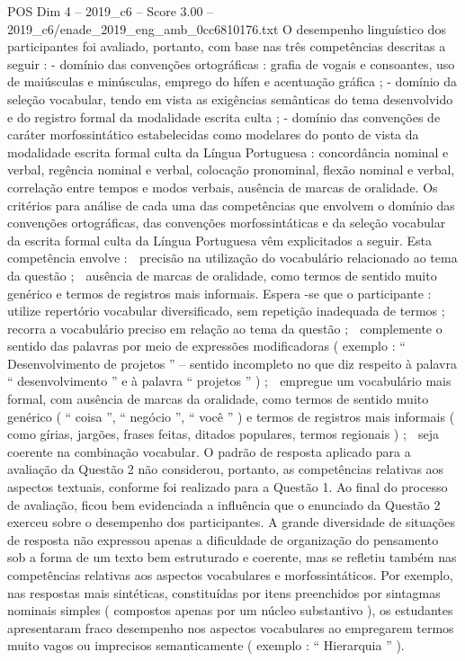 \begin{textsample}{POS Dim 4 – 2019\_c6 – Score 3.00 – 2019\_c6/enade\_2019\_eng\_amb\_0cc6810176.txt}
O desempenho linguístico dos participantes foi avaliado, portanto, com base nas três competências descritas a seguir : - domínio das convenções ortográficas : grafia de vogais e consoantes, uso de maiúsculas e minúsculas, emprego do hífen e acentuação gráfica ; - domínio da seleção vocabular, tendo em vista as exigências semânticas do tema desenvolvido e do registro formal da modalidade escrita culta ; - domínio das convenções de caráter morfossintático estabelecidas como modelares do ponto de vista da modalidade escrita formal culta da Língua Portuguesa : concordância nominal e verbal, regência nominal e verbal, colocação pronominal, flexão nominal e verbal, correlação entre tempos e modos verbais, ausência de marcas de oralidade.
Os critérios para análise de cada uma das competências que envolvem o domínio das convenções ortográficas, das convenções morfossintáticas e da seleção vocabular da escrita formal culta da Língua Portuguesa vêm explicitados a seguir.
Esta competência envolve :  precisão na utilização do vocabulário relacionado ao tema da questão ;  ausência de marcas de oralidade, como termos de sentido muito genérico e termos de registros mais informais.
Espera -se que o participante :  utilize repertório vocabular diversificado, sem repetição inadequada de termos ;  recorra a vocabulário preciso em relação ao tema da questão ;  complemente o sentido das palavras por meio de expressões modificadoras ( exemplo : “ Desenvolvimento de projetos ” – sentido incompleto no que diz respeito à palavra “ desenvolvimento ” e à palavra “ projetos ” ) ;  empregue um vocabulário mais formal, com ausência de marcas da oralidade, como termos de sentido muito genérico ( “ coisa ”, “ negócio ”, “ você ” ) e termos de registros mais informais ( como gírias, jargões, frases feitas, ditados populares, termos regionais ) ;  seja coerente na combinação vocabular.
O padrão de resposta aplicado para a avaliação da Questão 2 não considerou, portanto, as competências relativas aos aspectos textuais, conforme foi realizado para a Questão 1.
Ao final do processo de avaliação, ficou bem evidenciada a influência que o enunciado da Questão 2 exerceu sobre o desempenho dos participantes.
A grande diversidade de situações de resposta não expressou apenas a dificuldade de organização do pensamento sob a forma de um texto bem estruturado e coerente, mas se refletiu também nas competências relativas aos aspectos vocabulares e morfossintáticos.
Por exemplo, nas respostas mais sintéticas, constituídas por itens preenchidos por sintagmas nominais simples ( compostos apenas por um núcleo substantivo ), os estudantes apresentaram fraco desempenho nos aspectos vocabulares ao empregarem termos muito vagos ou imprecisos semanticamente ( exemplo : “ Hierarquia ” ).

\end{textsample}
